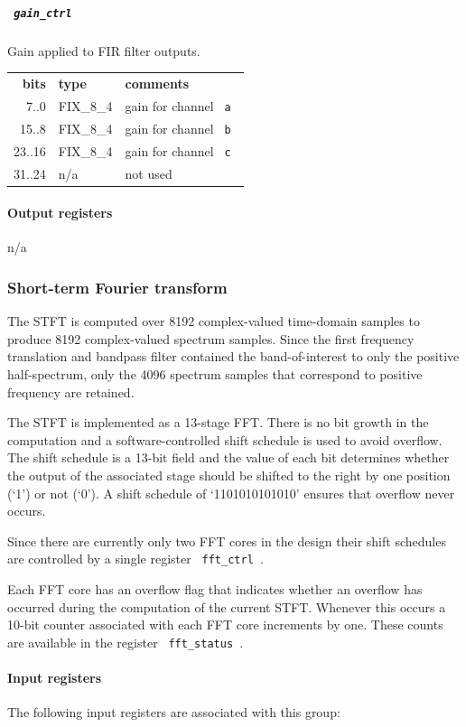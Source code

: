 \documentclass[a4paper,10pt]{article}
\newcommand{\ilcode}[1]{\begingroup
	\setlength{\fboxsep}{1pt}\colorbox{ilcodebg}{\small\tt%
		#1%
	}\endgroup}
\begin{document}
\subparagraph{\ilcode{gain\_ctrl}}
Gain applied to FIR filter outputs.\\
\begin{tabular}{rll}
	{\bf bits} & {\bf type} & {\bf comments}\\
	  7..0 & FIX\_8\_4 & gain for channel \ilcode{a}\\
	 15..8 & FIX\_8\_4 & gain for channel \ilcode{b}\\
	23..16 & FIX\_8\_4 & gain for channel \ilcode{c}\\
	31..24 & n/a & not used
\end{tabular}

\paragraph{Output registers}
n/a

\subsubsection{Short-term Fourier transform}
\label{sec:gwdcpfft}
The STFT is computed over 8192 complex-valued time-domain samples to 
produce 8192 complex-valued spectrum samples. Since the first frequency 
translation and bandpass filter contained the band-of-interest to only 
the positive half-spectrum, only the 4096 spectrum samples that 
correspond to positive frequency are retained.

The STFT is implemented as a 13-stage FFT. There is no bit growth in the 
computation and a software-controlled shift schedule is used to avoid 
overflow. The shift schedule is a 13-bit field and the value of each bit 
determines whether the output of the associated stage should be shifted 
to the right by one position (`1') or not (`0'). A shift schedule of 
`1101010101010' ensures that overflow never occurs.

Since there are currently only two FFT cores in the design their shift 
schedules are controlled by a single register \ilcode{fft\_ctrl}.

Each FFT core has an overflow flag that indicates whether an overflow 
has occurred during the computation of the current STFT. Whenever this 
occurs a 10-bit counter associated with each FFT core increments by one. 
These counts are available in the register \ilcode{fft\_status}.

\paragraph{Input registers}
The following input registers are associated with this group:
\end{document}
